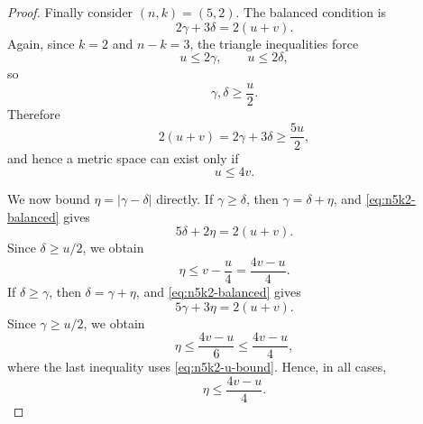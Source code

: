 \documentclass[10pt,a4paper]{amsart}
\begin{document}
\begin{proof}
Finally consider \((n,k)=(5,2)\).  The balanced condition is
\begin{equation}\label{eq:n5k2-balanced}
2\gamma+3\delta=2(u+v).
\end{equation}
Again, since \(k=2\) and \(n-k=3\), the triangle inequalities force
\begin{equation}\label{eq:n5k2-lower-bounds}
u\leq 2\gamma,
\qquad
u\leq 2\delta,
\end{equation}
so
\begin{equation}\label{eq:n5k2-gamma-delta-lower}
\gamma,\delta\geq \frac{u}{2}.
\end{equation}
Therefore
\begin{equation}\label{eq:n5k2-necessary}
2(u+v)=2\gamma+3\delta\geq \frac{5u}{2},
\end{equation}
and hence a metric space can exist only if
\begin{equation}\label{eq:n5k2-u-bound}
u\leq 4v.
\end{equation}

We now bound \(\eta=|\gamma-\delta|\) directly.  If \(\gamma\geq \delta\),
then \(\gamma=\delta+\eta\), and \eqref{eq:n5k2-balanced} gives
\begin{equation}\label{eq:n5k2-case-one-delta}
5\delta+2\eta=2(u+v).
\end{equation}
Since \(\delta\geq u/2\), we obtain
\begin{equation}\label{eq:n5k2-case-one-eta}
\eta\leq v-\frac{u}{4}
=
\frac{4v-u}{4}.
\end{equation}
If \(\delta\geq \gamma\), then \(\delta=\gamma+\eta\), and
\eqref{eq:n5k2-balanced} gives
\begin{equation}\label{eq:n5k2-case-two-gamma}
5\gamma+3\eta=2(u+v).
\end{equation}
Since \(\gamma\geq u/2\), we obtain
\begin{equation}\label{eq:n5k2-case-two-eta}
\eta\leq \frac{4v-u}{6}
\leq
\frac{4v-u}{4},
\end{equation}
where the last inequality uses \eqref{eq:n5k2-u-bound}.  Hence, in all cases,
\begin{equation}\label{eq:n5k2-eta-bound}
\eta\leq \frac{4v-u}{4}.
\end{equation}


\end{proof}
\end{document}
